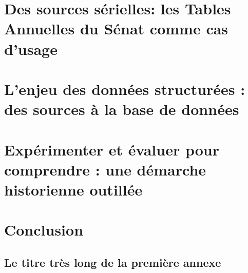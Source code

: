 \documentclass[12pt,twoside]{book}
\begin{document}
\newpage{\pagestyle{empty}\cleardoublepage}


\mainmatter

\part{Des sources sérielles: les Tables Annuelles du Sénat comme cas d'usage}






\part{L'enjeu des données structurées : des sources à la base de données}






\part{Expérimenter et évaluer pour comprendre : une démarche historienne outillée}

%




\part{Conclusion}


\appendix %

\chapter[Titre court]{Le titre très long de la première annexe}

%

\newpage{\pagestyle{empty}\cleardoublepage}


\backmatter %

\tableofcontents
\end{document}
